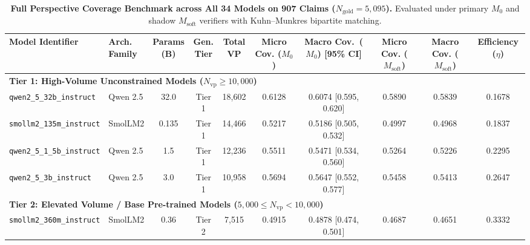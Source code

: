 \documentclass[11pt,a4paper]{article}
\begin{document}
\begin{table}[htbp]
\centering
\scriptsize
\caption{\textbf{Full Perspective Coverage Benchmark across All 34 Models on 907 Claims ($N_{\text{gold}} = 5,095$).} Evaluated under primary $M_0$ and shadow $M_{\text{soft}}$ verifiers with Kuhn--Munkres bipartite matching.}
\label{tab:master_benchmark}
\setlength{\tabcolsep}{3.5pt}
\begin{adjustbox}{max width=\textwidth}
\begin{tabular}{l l c c c c c c c c}
\toprule
\textbf{Model Identifier} & \makecell{\textbf{Arch.}\\\textbf{Family}} & \makecell{\textbf{Params}\\\textbf{(B)}} & \makecell{\textbf{Gen.}\\\textbf{Tier}} & \makecell{\textbf{Total}\\\textbf{VP}} & \makecell{\textbf{Micro Cov.}\\\textbf{($M_0$)}} & \makecell{\textbf{Macro Cov.~($M_0$)}\\\textbf{[95\% CI]}} & \makecell{\textbf{Micro Cov.}\\\textbf{($M_{\text{soft}}$)}} & \makecell{\textbf{Macro Cov.}\\\textbf{($M_{\text{soft}}$)}} & \makecell{\textbf{Efficiency}\\\textbf{($\eta$)}} \\
\midrule
\multicolumn{10}{l}{\textbf{Tier 1: High-Volume Unconstrained Models ($N_{\text{vp}} \ge 10,000$)}} \\
\texttt{qwen2\_5\_32b\_instruct} & Qwen 2.5 & 32.0 & Tier 1 & 18,602 & 0.6128 & 0.6074 [0.595, 0.620] & 0.5890 & 0.5839 & 0.1678 \\
\texttt{smollm2\_135m\_instruct} & SmolLM2 & 0.135 & Tier 1 & 14,466 & 0.5217 & 0.5186 [0.505, 0.532] & 0.4997 & 0.4968 & 0.1837 \\
\texttt{qwen2\_5\_1\_5b\_instruct} & Qwen 2.5 & 1.5 & Tier 1 & 12,236 & 0.5511 & 0.5471 [0.534, 0.560] & 0.5264 & 0.5226 & 0.2295 \\
\texttt{qwen2\_5\_3b\_instruct} & Qwen 2.5 & 3.0 & Tier 1 & 10,958 & 0.5694 & 0.5647 [0.552, 0.577] & 0.5458 & 0.5413 & 0.2647 \\
\midrule
\multicolumn{10}{l}{\textbf{Tier 2: Elevated Volume / Base Pre-trained Models ($5,000 \le N_{\text{vp}} < 10,000$)}} \\
\texttt{smollm2\_360m\_instruct} & SmolLM2 & 0.36 & Tier 2 & 7,515 & 0.4915 & 0.4878 [0.474, 0.501] & 0.4687 & 0.4651 & 0.3332 \\

\end{tabular}
\end{adjustbox}
\end{table}
\end{document}
